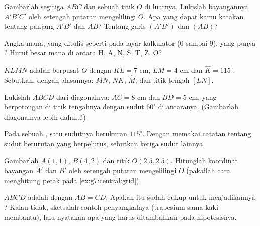 \begin{exercise}[$\star$]\label{exo:g7:central:2}
Gambarlah segitiga $ABC$ dan sebuah titik $O$ di luarnya. Lukislah
bayangannya $A'B'C'$ oleh setengah putaran mengelilingi $O$. Apa yang
dapat kamu katakan tentang panjang $A'B'$ dan $AB$? Tentang garis
$(A'B')$ dan $(AB)$?
\end{exercise}

\begin{exercise}[$\star$]\label{exo:g7:central:3}
Angka mana, yang ditulis seperti pada layar kalkulator ($0$ sampai
$9$), yang punya ? Huruf besar mana di antara H, A, N, S,
T, Z, O?
\end{exercise}

\begin{exercise}[$\star$]\label{exo:g7:central:4}
$KLMN$ adalah  berpusat $O$ dengan $KL = 7$ cm,
$LM = 4$ cm dan $\widehat K = 115^\circ$. Sebutkan, dengan alasannya:
$MN$, $NK$, $\widehat M$, dan titik tengah $[LN]$.
\end{exercise}

\begin{exercise}[$\star$]\label{exo:g7:central:5}
Lukislah  $ABCD$ dari diagonalnya: $AC = 8$ cm dan
$BD = 5$ cm, yang berpotongan di titik tengahnya dengan sudut
$60^\circ$ di antaranya. (Gambarlah diagonalnya lebih dahulu!)
\end{exercise}

\begin{exercise}[$\star$]\label{exo:g7:central:6}
Pada sebuah , satu sudutnya berukuran $115^\circ$. Dengan
memakai catatan tentang sudut berurutan yang berpelurus, sebutkan
ketiga sudut lainnya.
\end{exercise}

\begin{exercise}[$\star\star$]\label{exo:g7:central:7}
Gambarlah $A(1, 1)$, $B(4, 2)$ dan titik $O(2.5, 2.5)$. Hitunglah
koordinat bayangan $A'$ dan $B'$ oleh setengah putaran mengelilingi
$O$ (pakailah cara menghitung petak pada \cref{ex:g7:central:grid}).
\end{exercise}

\begin{exercise}[$\star\star$]\label{exo:g7:central:8}
$ABCD$ adalah  dengan $AB = CD$. Apakah itu sudah cukup
untuk menjadikannya ? Kalau tidak, sketsalah contoh
penyangkalnya (trapesium sama kaki membantu), lalu nyatakan apa yang
harus ditambahkan pada hipotesisnya.
\end{exercise}

